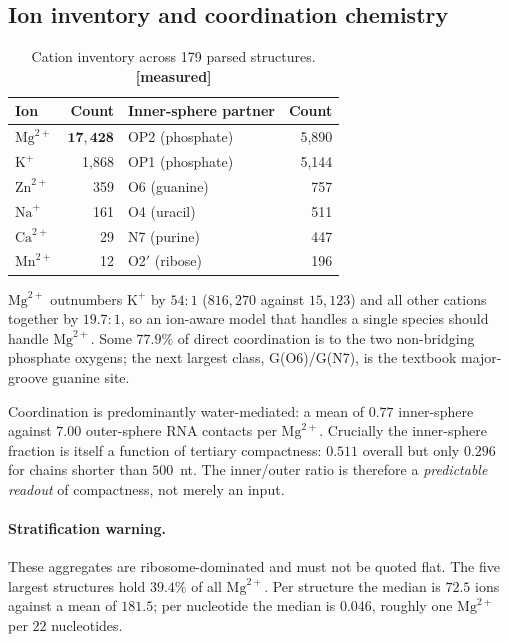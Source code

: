 \documentclass[11pt,a4paper]{article}
\newcommand{\meas}{\textcolor{measured}{\textbf{[measured]}}}
\begin{document}
\subsection{Ion inventory and coordination chemistry}

\begin{table}[h]
\centering
\caption{Cation inventory across 179 parsed structures. \meas}
\label{tab:ions}
\begin{tabular}{lr@{\hskip 2em}lr}
\toprule
\textbf{Ion} & \textbf{Count} & \textbf{Inner-sphere partner} & \textbf{Count} \\
\midrule
$\mathrm{Mg}^{2+}$ & $\mathbf{17{,}428}$ & OP2 (phosphate) & 5{,}890 \\
$\mathrm{K}^{+}$   & 1{,}868 & OP1 (phosphate) & 5{,}144 \\
$\mathrm{Zn}^{2+}$ & 359   & O6 (guanine)    & 757 \\
$\mathrm{Na}^{+}$  & 161   & O4 (uracil)     & 511 \\
$\mathrm{Ca}^{2+}$ & 29    & N7 (purine)     & 447 \\
$\mathrm{Mn}^{2+}$ & 12    & O2$'$ (ribose)  & 196 \\
\bottomrule
\end{tabular}
\end{table}

$\mathrm{Mg}^{2+}$ outnumbers $\mathrm{K}^{+}$ by $54\!:\!1$ ($816{,}270$ against
$15{,}123$) and all other cations together by $19.7\!:\!1$, so an ion-aware model
that handles a single species should handle $\mathrm{Mg}^{2+}$.
Some $77.9\%$ of direct coordination is to the two non-bridging phosphate oxygens;
the next largest class, G(O6)/G(N7), is the textbook major-groove guanine site.

Coordination is predominantly water-mediated: a mean of $0.77$ inner-sphere
against $7.00$ outer-sphere RNA contacts per $\mathrm{Mg}^{2+}$. Crucially the
inner-sphere fraction is itself a function of tertiary compactness: $0.511$
overall but only $0.296$ for chains shorter than $500$~nt. The inner/outer ratio
is therefore a \emph{predictable readout} of compactness, not merely an input.

\paragraph{Stratification warning.} These aggregates are ribosome-dominated and
must not be quoted flat. The five largest structures hold $39.4\%$ of all
$\mathrm{Mg}^{2+}$. Per structure the median is $72.5$ ions against a mean of
$181.5$; per nucleotide the median is $0.046$, roughly one $\mathrm{Mg}^{2+}$
per $22$ nucleotides.
\end{document}
